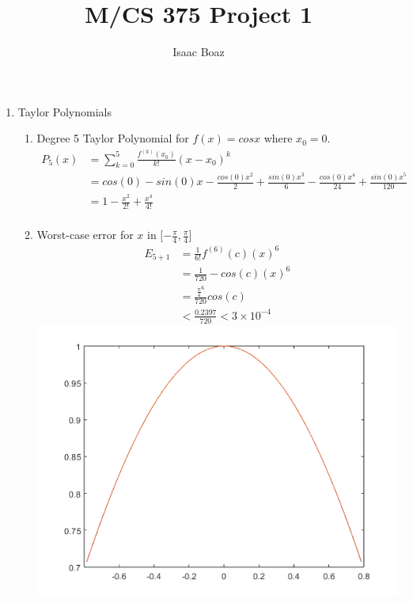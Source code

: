 \documentclass{article}
\title{\vspace{-5ex}M/CS 375 Project 1}
\author{Isaac Boaz}
\begin{document}
\maketitle

\begin{enumerate}
    \item Taylor Polynomials
          \begin{enumerate}[label=(\alph*)]
              \item Degree 5 Taylor Polynomial for \(f(x) = cos x\) where \(x_0 = 0\).
                    \begin{align*}
                        P_5(x) & = \sum_{k=0}^5 \frac{f^{(k)}(x_0)}{k!}(x-x_0)^k                                                               \\
                               & = cos(0) - sin(0)x - \frac{cos(0)x^2}{2} + \frac{sin(0)x^3}{6} - \frac{cos(0)x^4}{24} + \frac{sin(0)x^5}{120} \\
                               & = 1 - \frac{x^2}{2!} + \frac{x^4}{4!}                                                                         \\
                    \end{align*}
              \item Worst-case error for \(x\) in \(\lbrack -\frac{\pi}{4}, \frac{\pi}{4}\rbrack\)
                    \begin{align*}
                        E_{5+1} & = \frac{1}{6!}f^{(6)}(c)(x)^6           \\
                                & = \frac{1}{720} -cos(c)(x)^6            \\
                                & = \frac{\frac{\pi}{4}^6}{720}cos(c)     \\
                                & < \frac{0.2397}{720} < 3 \times 10^{-4}
                    \end{align*}
                    \includegraphics[scale=0.50]{cosgraph.png}

\end{enumerate}
\end{enumerate}
\end{document}
